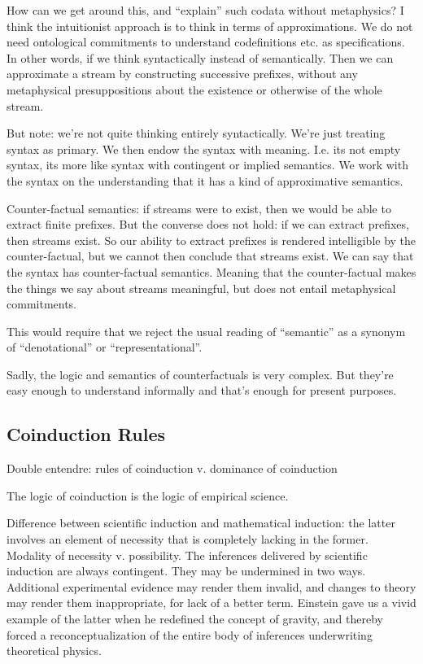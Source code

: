 \documentclass{article}
\begin{document}
How can we get around this, and ``explain'' such codata without
metaphysics? I think the intuitionist approach is to think in terms of
approximations. We do not need ontological commitments to understand
codefinitions etc. as specifications. In other words, if we think
syntactically instead of semantically. Then we can approximate a
stream by constructing successive prefixes, without any metaphysical
presuppositions about the existence or otherwise of the whole stream.

But note: we're not quite thinking entirely syntactically. We're just
treating syntax as primary. We then endow the syntax with meaning.
I.e. its not empty syntax, its more like syntax with contingent or
implied semantics. We work with the syntax on the understanding that
it has a kind of approximative semantics.

Counter-factual semantics: if streams were to exist, then we would be
able to extract finite prefixes. But the converse does not hold: if we
can extract prefixes, then streams exist. So our ability to extract
prefixes is rendered intelligible by the counter-factual, but we
cannot then conclude that streams exist. We can say that the syntax
has counter-factual semantics. Meaning that the counter-factual makes
the things we say about streams meaningful, but does not entail
metaphysical commitments.

This would require that we reject the usual reading of ``semantic'' as a
synonym of ``denotational'' or ``representational''.

Sadly, the logic and semantics of counterfactuals is very complex. But
they're easy enough to understand informally and that's enough for
present purposes.

 \cite{sep-counterfactuals}


\subsection{Coinduction Rules}

Double entendre: rules of coinduction v. dominance of coinduction

The logic of coinduction is the logic of empirical science.

Difference between scientific induction and mathematical induction:
the latter involves an element of necessity that is completely lacking
in the former. Modality of necessity v. possibility. The inferences
delivered by scientific induction are always contingent. They may be
undermined in two ways. Additional experimental evidence may render
them invalid, and changes to theory may render them inappropriate, for
lack of a better term. Einstein gave us a vivid example of the latter
when he redefined the concept of gravity, and thereby forced a
reconceptualization of the entire body of inferences underwriting
theoretical physics.
\end{document}
